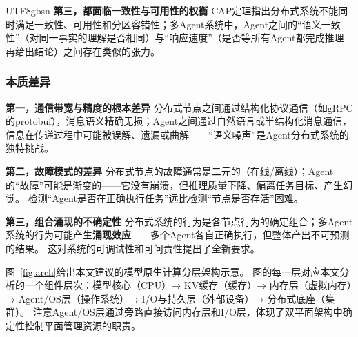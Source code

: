 \documentclass[11pt,a4paper]{article}
\begin{document}
\begin{CJK*}{UTF8}{gbsn}
\textbf{第三，都面临一致性与可用性的权衡}
CAP定理指出分布式系统不能同时满足一致性、可用性和分区容错性\cite{cap2002}；多Agent系统中，Agent之间的``语义一致性''（对同一事实的理解是否相同）与``响应速度''（是否等所有Agent都完成推理再给出结论）之间存在类似的张力。

\subsubsection{本质差异}

\textbf{第一，通信带宽与精度的根本差异}
分布式节点之间通过结构化协议通信（如gRPC的protobuf），消息语义精确无损；Agent之间通过自然语言或半结构化消息通信，信息在传递过程中可能被误解、遗漏或曲解——``语义噪声''是Agent分布式系统的独特挑战。

\textbf{第二，故障模式的差异}
分布式节点的故障通常是二元的（在线/离线）；Agent的``故障''可能是渐变的——它没有崩溃，但推理质量下降、偏离任务目标、产生幻觉。
检测``Agent是否在正确执行任务''远比检测``节点是否存活''困难。

\textbf{第三，组合涌现的不确定性}
分布式系统的行为是各节点行为的确定组合；多Agent系统的行为可能产生\textbf{涌现效应}——多个Agent各自正确执行，但整体产出不可预测的结果。
这对系统的可调试性和可问责性提出了全新要求。


图~\ref{fig:arch}给出本文建议的模型原生计算分层架构示意。
图的每一层对应本文分析的一个组件层次：模型核心（CPU）→ KV缓存（缓存）→ 内存层（虚拟内存）→ Agent/OS层（操作系统）→ I/O与持久层（外部设备）→ 分布式底座（集群）。
注意Agent/OS层通过旁路直接访问内存层和I/O层，体现了双平面架构中确定性控制平面管理资源的职责。


\end{CJK*}
\end{document}
